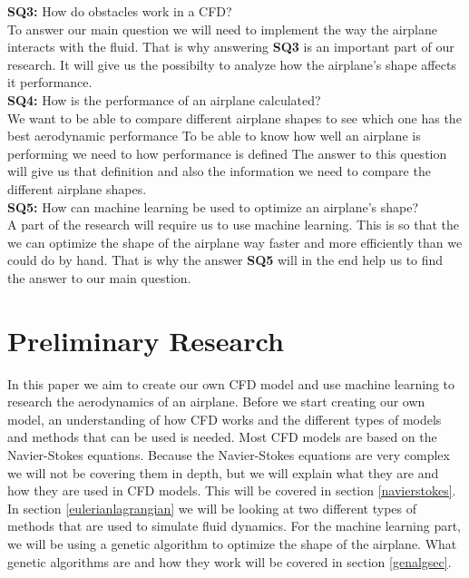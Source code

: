 \documentclass[a4paper,12pt,titlepage]{article}
\begin{document}
\textbf{SQ3:} How do obstacles work in a CFD?\\

To answer our main question we will need to implement the way the airplane interacts with the fluid. 
That is why answering \textbf{SQ3} is an important part of our research. 
It will give us the possibilty to analyze how the airplane's shape affects it performance. \\

\textbf{SQ4:} How is the performance of an airplane calculated? \\

We want to be able to compare different airplane shapes to see which one has the best aerodynamic performance 
To be able to know how well an airplane is performing we need to how performance is defined
The answer to this question will give us that definition and also the information we need to compare the different airplane shapes.\\

\textbf{SQ5:} How can machine learning be used to optimize an airplane's shape? \\

A part of the research will require us to use machine learning. 
This is so that the we can optimize the shape of the airplane way faster and more efficiently than we could do by hand.
That is why the answer \textbf{SQ5} will in the end help us to find the answer to our main question. 

\pagebreak

\section{Preliminary Research}
In this paper we aim to create our own CFD model and use machine learning to research the aerodynamics of an airplane.
Before we start creating our own model, an understanding of how CFD works 
and the different types of models and methods that can be used is needed.
Most CFD models are based on the Navier-Stokes equations. Because the Navier-Stokes equations are very complex we will not be covering them in depth, 
but we will explain what they are and how they are used in CFD models.
This will be covered in section \ref{navierstokes}.
In section \ref{eulerianlagrangian} we will be looking at two different types of methods that are used to simulate fluid dynamics.
For the machine learning part, we will be using a genetic algorithm to optimize the shape of the airplane. 
What genetic algorithms are and how they work will be covered in section \ref{genalgsec}.
\end{document}
